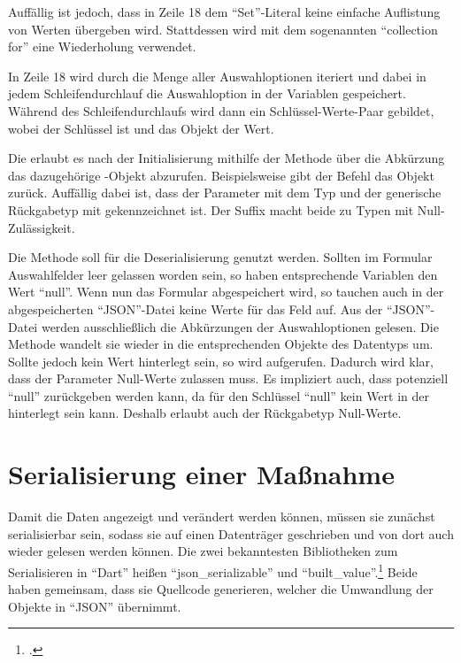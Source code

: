 Auffällig ist jedoch, dass in Zeile 18 dem \enquote{Set}-Literal keine einfache Auflistung von Werten übergeben wird.
Stattdessen wird mit dem sogenannten \enquote{collection for} eine Wiederholung verwendet.



In Zeile 18 wird durch die  Menge aller Auswahloptionen  iteriert und dabei in jedem Schleifendurchlauf die Auswahloption in der Variablen  gespeichert.
Während des Schleifendurchlaufs wird dann ein Schlüssel-Werte-Paar gebildet, wobei  der Schlüssel ist und das Objekt  der Wert.

Die   erlaubt es nach der Initialisierung mithilfe der Methode   über die Abkürzung das dazugehörige -Objekt abzurufen.
Beispielsweise gibt der Befehl  das Objekt  zurück.
Auffällig dabei ist, dass der Parameter  mit dem Typ  und der generische Rückgabetyp mit  gekennzeichnet ist. Der Suffix  macht beide zu Typen mit Null-Zulässigkeit.



Die Methode  soll für die Deserialisierung genutzt werden.
 Sollten im Formular Auswahlfelder leer gelassen worden sein, so haben  entsprechende Variablen den Wert \enquote{null}.
Wenn nun das Formular abgespeichert wird, so tauchen auch in der abgespeicherten \enquote{JSON}-Datei keine Werte für das Feld auf.
Aus der \enquote{JSON}-Datei werden ausschließlich die Abkürzungen der Auswahloptionen gelesen.
Die Methode  wandelt sie wieder in die entsprechenden Objekte des Datentyps  um.
Sollte jedoch kein Wert hinterlegt sein, so wird  aufgerufen. Dadurch wird klar,
dass der Parameter Null-Werte zulassen muss.
Es impliziert auch,
dass potenziell \enquote{null} zurückgeben werden kann, da für den Schlüssel \enquote{null} kein Wert in der  hinterlegt sein kann.
Deshalb  erlaubt auch der Rückgabetyp  Null-Werte.


\section{Serialisierung einer Maßnahme}

Damit die Daten angezeigt und verändert werden können, müssen sie zunächst serialisierbar sein, sodass sie auf einen Datenträger geschrieben und von dort auch wieder gelesen werden können.
Die zwei bekanntesten Bibliotheken zum Serialisieren in \enquote{Dart} heißen \enquote{json_serializable} und \enquote{built_value}.\footcite[Vgl.][]{JSONAndSerialization}
Beide haben gemeinsam, dass sie Quellcode generieren, welcher die Umwandlung der Objekte in \enquote{JSON} übernimmt.


